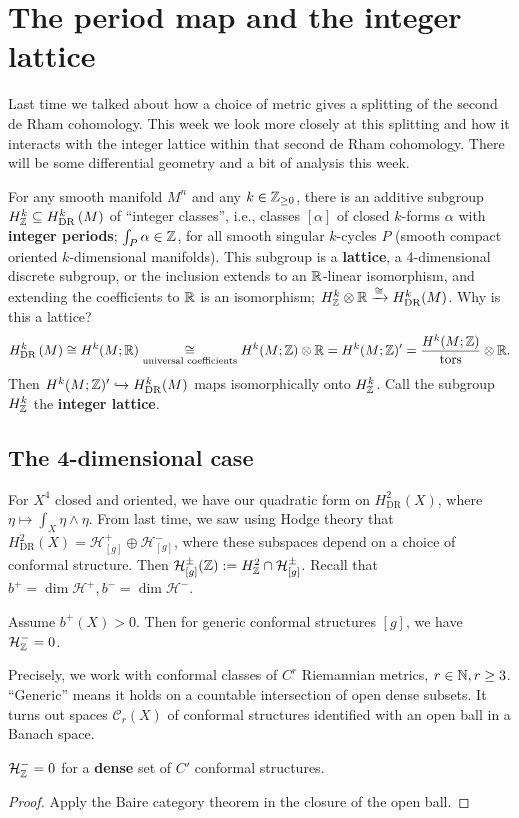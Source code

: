 \section{The period map and the integer lattice} 
Last time we talked about how a choice of metric gives a splitting of the second de Rham cohomology. This week we look more closely at this splitting and how it interacts with the integer lattice within that second de Rham cohomology. There will be some differential geometry and a bit of analysis this week.

For any smooth manifold $M^n $ and any $k \in \mathbb{Z} _{\geq 0}$, there is an additive subgroup $H_{\mathbb{Z}}^k \subseteq H^k  _{\mathrm{DR}}\left( M \right) $ of ``integer classes'', i.e., classes $[\alpha ]$ of closed  $k$-forms $\alpha $ with \textbf{integer periods}; $\int_P \alpha  \in \mathbb{Z}$, for all smooth singular $k$-cycles $P$ (smooth compact oriented $k$-dimensional manifolds). This subgroup is a \textbf{lattice}, a 4-dimensional discrete subgroup, or the inclusion extends to an $\mathbb{R}$-linear isomorphism, and extending the coefficients to $\mathbb{R}$ is an isomorphism; $H_{\mathbb{Z}}^k \otimes \mathbb{R} \xrightarrow{\cong } H^k_{\mathrm{DR}}(M)$.
Why is this a lattice?  \[
    H^k_{\mathrm{DR}}\left( M \right) \cong  H^k(M; \mathbb{R}) \underset{\text{universal coefficients}}{\cong}  H^k(M;\mathbb{Z})\otimes \mathbb{R} = H^k(M;\mathbb{Z})'=\frac{H^k(M;\mathbb{Z})}{\text{tors}} \otimes \mathbb{R}.
\] Then $H^k(M;\mathbb{Z})' \hookrightarrow H_{\mathrm{DR}}^k(M)$ maps isomorphically onto $H_{\mathbb{Z}}^k$. Call the subgroup $H^k _{\mathbb{Z}}$ the \textbf{integer lattice}.

\subsection{The 4-dimensional case}
For $X^4$ closed and oriented, we have our quadratic form on $H^2_{\mathrm{DR}}(X)$, where $\eta \mapsto  \int_X \eta \wedge \eta$. From last time, we saw using Hodge theory that $H^2_{\mathrm{DR}}(X)=\mathcal H^+_{[g]} \oplus \mathcal H^-_{[g]}$, where these subspaces depend on a choice of conformal structure. Then $\mathcal H^{\pm}_{[g]}(\mathbb{Z}) := H^2 _{\mathbb{Z}}\cap  \mathcal H^{\pm}_{[g]}$.
Recall that $b^+ = \dim \mathcal H^+, b^- = \dim \mathcal H^-$. 
\begin{theorem}
    Assume $b^+(X) > 0$. Then for generic conformal structures $[g]$, we have $\mathcal H_{\mathbb{Z}}^- =0$. 
\end{theorem}
Precisely, we work with conformal classes of $C^r$ Riemannian metrics, $r \in \mathbb{N}, r \geq 3$. ``Generic'' means it holds on a countable intersection of open dense subsets. It turns out spaces $\mathcal C_r(X)$ of conformal structures identified with an open ball in a Banach space.
\begin{cor}
    $\mathcal H_{\mathbb{Z}}^- = 0$ for a \textbf{dense} set of $C'$ conformal structures.
\end{cor}
\begin{proof}
    Apply the Baire category theorem in the closure of the open ball. 
\end{proof}

